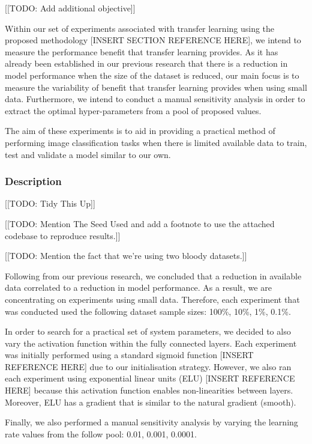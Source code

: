 \documentclass{article}
\begin{document}
[[TODO: Add additional objective]]

Within our set of experiments associated with transfer learning using the proposed methodology [INSERT SECTION REFERENCE HERE], we intend to measure the performance benefit that transfer learning provides. As it has already been established in our previous research that there is a reduction in model performance when the size of the dataset is reduced, our main focus is to measure the variability of benefit that transfer learning provides when using small data. Furthermore, we intend to conduct a manual sensitivity analysis in order to extract the optimal hyper-parameters from a pool of proposed values.

The aim of these experiments is to aid in providing a practical method of performing image classification tasks when there is limited available data to train, test and validate a model similar to our own.

\subsubsection{\textbf{Description}}

[[TODO: Tidy This Up]]

[[TODO: Mention The Seed Used and add a footnote to use the attached codebase to reproduce results.]]

[[TODO: Mention the fact that we're using two bloody datasets.]]

Following from our previous research, we concluded that a reduction in available data correlated to a reduction in model performance. As a result, we are concentrating on experiments using small data. Therefore, each experiment that was conducted used the following dataset sample sizes: 100\%, 10\%, 1\%, 0.1\%.

In order to search for a practical set of system parameters, we decided to also vary the activation function within the fully connected layers. Each experiment was initially performed using a standard sigmoid function [INSERT REFERENCE HERE] due to our initialisation strategy. However, we also ran each experiment using exponential linear units (ELU) [INSERT REFERENCE HERE] because this activation function enables non-linearities between layers. Moreover, ELU has a gradient that is similar to the natural gradient (smooth).

Finally, we also performed a manual sensitivity analysis by varying the learning rate values from the follow pool: 0.01, 0.001, 0.0001.
\end{document}
